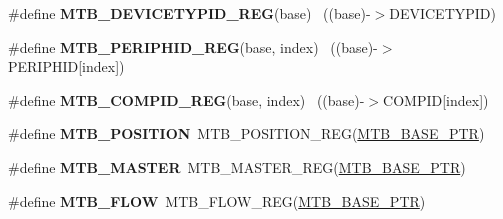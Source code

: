 \begin{DoxyCompactItemize}
\item 
\hypertarget{group___m_t_b___register___accessor___macros_gacbe9bf97189a4f6f2b4816c957e4bbf3}{}\#define {\bfseries M\+T\+B\+\_\+\+D\+E\+V\+I\+C\+E\+T\+Y\+P\+I\+D\+\_\+\+R\+E\+G}(base)                            ~((base)-\/$>$D\+E\+V\+I\+C\+E\+T\+Y\+P\+I\+D)\label{group___m_t_b___register___accessor___macros_gacbe9bf97189a4f6f2b4816c957e4bbf3}

\item 
\hypertarget{group___m_t_b___register___accessor___macros_gafcffdf38c49f6e8fafa6d701a8cc3109}{}\#define {\bfseries M\+T\+B\+\_\+\+P\+E\+R\+I\+P\+H\+I\+D\+\_\+\+R\+E\+G}(base,  index)                      ~((base)-\/$>$P\+E\+R\+I\+P\+H\+I\+D\mbox{[}index\mbox{]})\label{group___m_t_b___register___accessor___macros_gafcffdf38c49f6e8fafa6d701a8cc3109}

\item 
\hypertarget{group___m_t_b___register___accessor___macros_ga52410b03c889a62143894894543baf6e}{}\#define {\bfseries M\+T\+B\+\_\+\+C\+O\+M\+P\+I\+D\+\_\+\+R\+E\+G}(base,  index)                          ~((base)-\/$>$C\+O\+M\+P\+I\+D\mbox{[}index\mbox{]})\label{group___m_t_b___register___accessor___macros_ga52410b03c889a62143894894543baf6e}

\item 
\hypertarget{group___m_t_b___register___accessor___macros_ga2356017c5dd8a963f2566b41cdb0e2ea}{}\#define {\bfseries M\+T\+B\+\_\+\+P\+O\+S\+I\+T\+I\+O\+N}~M\+T\+B\+\_\+\+P\+O\+S\+I\+T\+I\+O\+N\+\_\+\+R\+E\+G(\hyperlink{group___m_t_b___peripheral_gadf7f362dfa67354951e6a23ddf08cd73}{M\+T\+B\+\_\+\+B\+A\+S\+E\+\_\+\+P\+T\+R})\label{group___m_t_b___register___accessor___macros_ga2356017c5dd8a963f2566b41cdb0e2ea}

\item 
\hypertarget{group___m_t_b___register___accessor___macros_ga8790f019f8279bebf92068c9f295280f}{}\#define {\bfseries M\+T\+B\+\_\+\+M\+A\+S\+T\+E\+R}~M\+T\+B\+\_\+\+M\+A\+S\+T\+E\+R\+\_\+\+R\+E\+G(\hyperlink{group___m_t_b___peripheral_gadf7f362dfa67354951e6a23ddf08cd73}{M\+T\+B\+\_\+\+B\+A\+S\+E\+\_\+\+P\+T\+R})\label{group___m_t_b___register___accessor___macros_ga8790f019f8279bebf92068c9f295280f}

\item 
\hypertarget{group___m_t_b___register___accessor___macros_ga9841006af8717076e984b80b1cfc2952}{}\#define {\bfseries M\+T\+B\+\_\+\+F\+L\+O\+W}~M\+T\+B\+\_\+\+F\+L\+O\+W\+\_\+\+R\+E\+G(\hyperlink{group___m_t_b___peripheral_gadf7f362dfa67354951e6a23ddf08cd73}{M\+T\+B\+\_\+\+B\+A\+S\+E\+\_\+\+P\+T\+R})\label{group___m_t_b___register___accessor___macros_ga9841006af8717076e984b80b1cfc2952}


\end{DoxyCompactItemize}
